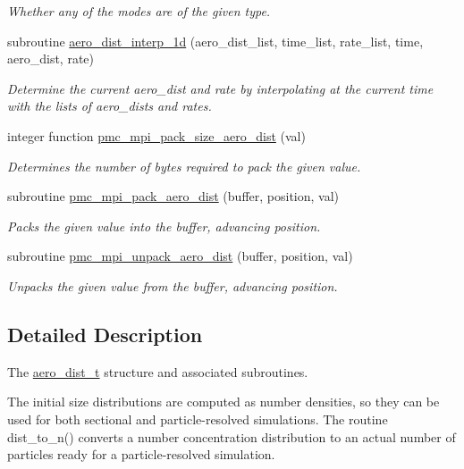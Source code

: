 \begin{DoxyCompactItemize}
\begin{DoxyCompactList}\small\item\em Whether any of the modes are of the given type. \end{DoxyCompactList}\item 
subroutine \mbox{\hyperlink{namespacepmc__aero__dist_a1fe0b780b71145acb4892b597f9218a5}{aero\+\_\+dist\+\_\+interp\+\_\+1d}} (aero\+\_\+dist\+\_\+list, time\+\_\+list, rate\+\_\+list, time, aero\+\_\+dist, rate)
\begin{DoxyCompactList}\small\item\em Determine the current aero\+\_\+dist and rate by interpolating at the current time with the lists of aero\+\_\+dists and rates. \end{DoxyCompactList}\item 
integer function \mbox{\hyperlink{namespacepmc__aero__dist_ac204813ce47a796777984e68f0e50dc7}{pmc\+\_\+mpi\+\_\+pack\+\_\+size\+\_\+aero\+\_\+dist}} (val)
\begin{DoxyCompactList}\small\item\em Determines the number of bytes required to pack the given value. \end{DoxyCompactList}\item 
subroutine \mbox{\hyperlink{namespacepmc__aero__dist_a33ef1e6098d7956dbdac21b37adfb337}{pmc\+\_\+mpi\+\_\+pack\+\_\+aero\+\_\+dist}} (buffer, position, val)
\begin{DoxyCompactList}\small\item\em Packs the given value into the buffer, advancing position. \end{DoxyCompactList}\item 
subroutine \mbox{\hyperlink{namespacepmc__aero__dist_a2a10f585be3b1cb326f523a68219dfa4}{pmc\+\_\+mpi\+\_\+unpack\+\_\+aero\+\_\+dist}} (buffer, position, val)
\begin{DoxyCompactList}\small\item\em Unpacks the given value from the buffer, advancing position. \end{DoxyCompactList}\end{DoxyCompactItemize}


\subsection{Detailed Description}
The \mbox{\hyperlink{structpmc__aero__dist_1_1aero__dist__t}{aero\+\_\+dist\+\_\+t}} structure and associated subroutines. 

The initial size distributions are computed as number densities, so they can be used for both sectional and particle-\/resolved simulations. The routine dist\+\_\+to\+\_\+n() converts a number concentration distribution to an actual number of particles ready for a particle-\/resolved simulation.

